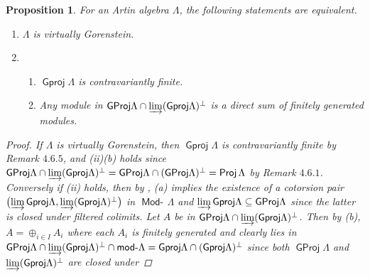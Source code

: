\documentclass[oneside, a4paper,reqno]{amsart}
\numberwithin{equation}{section}
\newtheorem{prop}[thm]{Proposition}
\theoremstyle{definition}
\begin{document}
\begin{prop} For an Artin algebra $\Lambda$, the following
statements are equivalent.
\begin{enumerate}
\item $\Lambda$ is virtually Gorenstein.
\item
\begin{enumerate}
\item ${\operatorname{\mathsf{Gproj}}\nolimits}\Lambda$ is contravariantly finite.
\item Any module in ${\operatorname{\mathsf{GProj}}\nolimits}\Lambda \cap
\operatorname*{\varinjlim}({\operatorname{\mathsf{Gproj}}\nolimits}\Lambda)^{\bot}$ is a direct sum of finitely generated
modules.
\end{enumerate}
\end{enumerate}
\begin{proof} If $\Lambda$ is virtually Gorenstein, then
${\operatorname{\mathsf{Gproj}}\nolimits}\Lambda$ is contravariantly finite by Remark $4.6.5$, and
(ii)(b) holds since ${\operatorname{\mathsf{GProj}}\nolimits}\Lambda \cap \operatorname*{\varinjlim}({\operatorname{\mathsf{Gproj}}\nolimits}\Lambda)^{\bot}
= {\operatorname{\mathsf{GProj}}\nolimits}\Lambda \cap ({\operatorname{\mathsf{GProj}}\nolimits}\Lambda)^{\bot} = \operatorname*{\mathsf{Proj}}\Lambda$ by
Remark $4.6.1$. Conversely if (ii) holds, then by \cite[Corollary
9.6]{B:cm}, (a) implies  the existence of a cotorsion pair
$\bigl(\operatorname*{\varinjlim}{\operatorname{\mathsf{Gproj}}\nolimits}\Lambda, \operatorname*{\varinjlim}({\operatorname{\mathsf{Gproj}}\nolimits}\Lambda)^{\bot}\bigr)$ in
$\operatorname*{\mathsf{Mod}-\!}\Lambda$ and $\operatorname*{\varinjlim}{\operatorname{\mathsf{Gproj}}\nolimits}\Lambda
 \subseteq {\operatorname{\mathsf{GProj}}\nolimits}\Lambda$ since the latter is closed under filtered
 colimits. Let $A$ be in ${\operatorname{\mathsf{GProj}}\nolimits}\Lambda \cap
\operatorname*{\varinjlim}({\operatorname{\mathsf{Gproj}}\nolimits}\Lambda)^{\bot}$. Then by (b), $A = \oplus_{i\in
I}A_{i}$ where each $A_{i}$ is finitely generated and clearly lies
in ${\operatorname{\mathsf{GProj}}\nolimits}\Lambda \cap \operatorname*{\varinjlim}({\operatorname{\mathsf{Gproj}}\nolimits}\Lambda)^{\bot} \cap
\operatorname*{\mathsf{mod}-\!}\Lambda = {\operatorname{\mathsf{Gproj}}\nolimits}\Lambda \cap ({\operatorname{\mathsf{Gproj}}\nolimits}\Lambda)^{\bot}$ since both
${\operatorname{\mathsf{GProj}}\nolimits}\Lambda$ and $\operatorname*{\varinjlim}({\operatorname{\mathsf{Gproj}}\nolimits}\Lambda)^{\bot}$ are closed under

\end{proof}
\end{prop}
\end{document}
